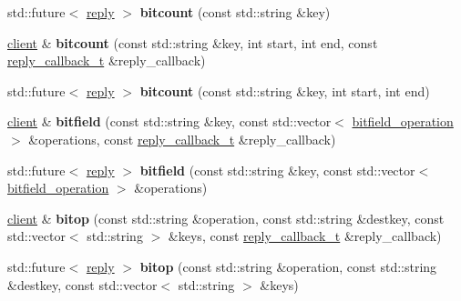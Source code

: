 \begin{DoxyCompactItemize}
std\+::future$<$ \hyperlink{classcpp__redis_1_1reply}{reply} $>$ {\bfseries bitcount} (const std\+::string \&key)
\item 
\mbox{\label{classcpp__redis_1_1client_ac631a06c8b69a2f1b4de3aabc19d68e2}} 
\hyperlink{classcpp__redis_1_1client}{client} \& {\bfseries bitcount} (const std\+::string \&key, int start, int end, const \hyperlink{classcpp__redis_1_1client_a061a1140d36d2eaeda82b09a0bb3f9f2}{reply\+\_\+callback\+\_\+t} \&reply\+\_\+callback)
\item 
\mbox{\label{classcpp__redis_1_1client_af2d2dc1c19d735e84d8e2725fb98dbda}} 
std\+::future$<$ \hyperlink{classcpp__redis_1_1reply}{reply} $>$ {\bfseries bitcount} (const std\+::string \&key, int start, int end)
\item 
\mbox{\label{classcpp__redis_1_1client_aff0b03777d5c8bcb1f6a9bc9349b1a31}} 
\hyperlink{classcpp__redis_1_1client}{client} \& {\bfseries bitfield} (const std\+::string \&key, const std\+::vector$<$ \hyperlink{structcpp__redis_1_1client_1_1bitfield__operation}{bitfield\+\_\+operation} $>$ \&operations, const \hyperlink{classcpp__redis_1_1client_a061a1140d36d2eaeda82b09a0bb3f9f2}{reply\+\_\+callback\+\_\+t} \&reply\+\_\+callback)
\item 
\mbox{\label{classcpp__redis_1_1client_a59d901d5bc9137f9bee0cd399fc07d2a}} 
std\+::future$<$ \hyperlink{classcpp__redis_1_1reply}{reply} $>$ {\bfseries bitfield} (const std\+::string \&key, const std\+::vector$<$ \hyperlink{structcpp__redis_1_1client_1_1bitfield__operation}{bitfield\+\_\+operation} $>$ \&operations)
\item 
\mbox{\label{classcpp__redis_1_1client_a9289b0f474073f59509b565d93c69506}} 
\hyperlink{classcpp__redis_1_1client}{client} \& {\bfseries bitop} (const std\+::string \&operation, const std\+::string \&destkey, const std\+::vector$<$ std\+::string $>$ \&keys, const \hyperlink{classcpp__redis_1_1client_a061a1140d36d2eaeda82b09a0bb3f9f2}{reply\+\_\+callback\+\_\+t} \&reply\+\_\+callback)
\item 
\mbox{\label{classcpp__redis_1_1client_adbb955ee435dea43898ef811b31421b3}} 
std\+::future$<$ \hyperlink{classcpp__redis_1_1reply}{reply} $>$ {\bfseries bitop} (const std\+::string \&operation, const std\+::string \&destkey, const std\+::vector$<$ std\+::string $>$ \&keys)

\end{DoxyCompactItemize}
